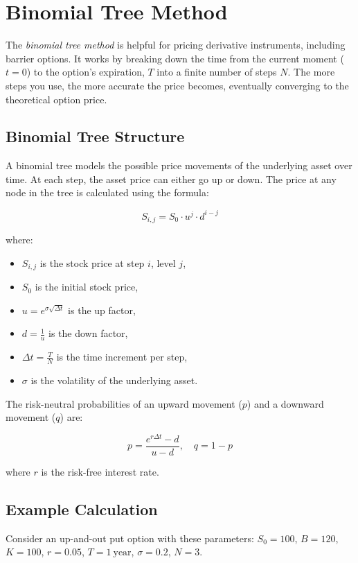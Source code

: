 \chapter{Binomial Tree Method}
\label{sec:binomial-tree}

The \textit{binomial tree method} is helpful for pricing derivative instruments, including barrier options. It works by breaking down the time from the current moment (\(t = 0\)) to the option's expiration, $T$ into a finite number of steps $N$. The more steps you use, the more accurate the price becomes, eventually converging to the theoretical option price.

\section{Binomial Tree Structure}

A binomial tree models the possible price movements of the underlying asset over time. At each step, the asset price can either go up or down. The price at any node in the tree is calculated using the formula:

\[
S_{i,j} = S_0 \cdot u^j \cdot d^{i-j}
\]

where:
\begin{itemize}
    \item \(S_{i,j}\) is the stock price at step \(i\), level \(j\),
    \item \(S_0\) is the initial stock price,
    \item \(u = e^{\sigma \sqrt{\Delta t}}\) is the up factor,
    \item \(d = \frac{1}{u}\) is the down factor,
    \item \(\Delta t = \frac{T}{N}\) is the time increment per step,
    \item \(\sigma\) is the volatility of the underlying asset.
\end{itemize}

The risk-neutral probabilities of an upward movement (\(p\)) and a downward movement (\(q\)) are:

\[
p = \frac{e^{r \Delta t} - d}{u - d}, \quad q = 1 - p
\]

where \(r\) is the risk-free interest rate.

\section{Example Calculation}

Consider an up-and-out put option with these parameters:
\(S_0 = 100\), \(B = 120\), \(K = 100\), \(r = 0.05\), \(T = 1\ \text{year}\), \(\sigma = 0.2\), \(N = 3\).

